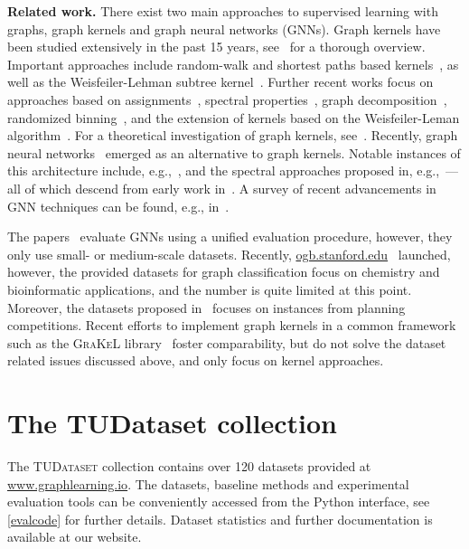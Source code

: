 \documentclass{article}
\newcommand{\xhdr}[1]{{\noindent\bfseries #1}}
\theoremstyle{definition}
\begin{document}
\xhdr{Related work.}
There exist two main approaches to supervised learning with graphs, graph kernels and graph neural networks (GNNs). Graph kernels have been studied extensively in the past 15 years, see~\cite{Kri+2019} for a thorough overview. Important approaches include random-walk and shortest paths based kernels~\cite{Gae+2003,Sugiyama2015,Bor+2005,Kri+2017b}, as well as the Weisfeiler-Lehman subtree kernel~\cite{She+2011,Mor+2017}. 
Further recent works focus on approaches based on assignments~\cite{Kri+2016,Nik+2017}, spectral properties~\cite{Kon+2016}, graph decomposition~\cite{Nik+2018}, randomized binning~\cite{Hei+2019}, and the extension of kernels based on the Weisfeiler-Leman algorithm~\cite{Tog+2019, Rie+2019}. For a theoretical investigation of graph kernels, see~\cite{Kri+2018}. Recently, graph neural networks~\cite{Gil+2017,Sca+2009} emerged as an alternative to graph kernels. Notable instances of this architecture include, e.g.,~\cite{Duv+2015,Ham+2017,Vel+2018}, and the spectral approaches proposed in, e.g.,~\cite{Bru+2014,Def+2015,Kip+2017,Mon+2017}---all of which descend from early work in~\cite{Kir+1995,Mer+2005,Spe+1997,Sca+2009}. A survey of recent advancements in GNN techniques can be found, e.g., in~\cite{Cha+2020,Wu+2019,Zho+2018}.

The papers~\cite{Fey+2019,Che+2019new,Err+2019,Dwi+2020} evaluate GNNs using a unified evaluation procedure, however, they only use small- or medium-scale datasets. Recently, \url{ogb.stanford.edu}~\cite{Hu+2020} launched, however, the provided datasets for graph classification focus on chemistry and bioinformatic applications, and the number is quite limited at this point. Moreover, the datasets proposed in~\cite{Fer+2019} focuses on instances from planning competitions. 
Recent efforts to implement graph kernels in a common framework such as the \textsc{GraKeL} library~\cite{Sig+2018} foster comparability, but do not solve the dataset related issues discussed above, and only focus on kernel approaches.


\section{The TUDataset collection}

The \textsc{TUDataset} collection contains over 120 datasets provided at \url{www.graphlearning.io}. The datasets, baseline methods and experimental evaluation tools can be conveniently accessed from the Python interface, see \cref{evalcode} for further details. Dataset statistics and further documentation is available at our website.
\end{document}
